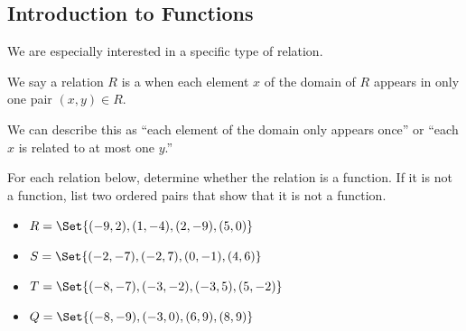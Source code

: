 \subsection{Introduction to Functions} 
We are especially interested in a specific type of relation.
\begin{definition}[Function]
We say a relation $R$ is a  when each element $x$ of the domain of $R$ appears in only one pair $(x,y)\in R$.
\end{definition}
We can describe this as ``each element of the domain only appears once'' or ``each $x$ is related to at most one $y$.''
\begin{Example}
For each relation below, determine whether the relation is a function. If it is not a function, list two ordered pairs that show that it is not a function.
\begin{itemize}
\item $R=\Set{(-9,2),(1,-4),(2,-9),(5,0)}$\makeblanknew
\item $S=\Set{(-2,-7),(-2,7),(0,-1),(4,6)}$\makeblanknew
\item $T=\Set{(-8,-7),(-3,-2),(-3,5),(5,-2)}$\makeblanknew
\item $Q=\Set{(-8,-9),(-3,0),(6,9),(8,9)}$\makeblanknew
\end{itemize}
\end{Example}
